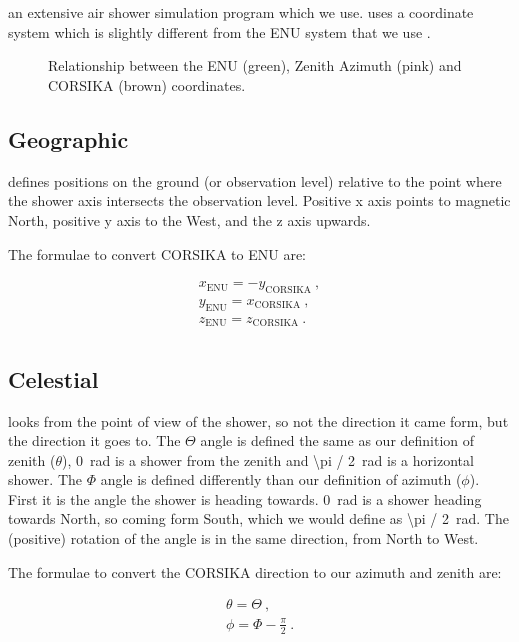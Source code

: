 \section{\corsika}

\corsika an extensive air shower simulation program which we use.
\corsika uses a coordinate system which is slightly different from the
ENU system that we use \cite{heck:2013aa}.

\begin{figure}
    \centering
    
    \caption{Relationship between the ENU (green), Zenith Azimuth (pink)
             and CORSIKA (brown) coordinates.}
    \label{fig:enu_corsika}
\end{figure}


\subsection{Geographic}

\corsika defines positions on the ground (or observation level) relative
to the point where the shower axis intersects the observation level.
Positive x axis points to magnetic North, positive y axis to the West,
and the z axis upwards.

The formulae to convert CORSIKA to ENU are:

\begin{equation}
    \begin{array}{l}
        x_{\mathrm{ENU}} = -y_{\mathrm{CORSIKA}} \ , \\
        y_{\mathrm{ENU}} = x_{\mathrm{CORSIKA}} \ , \\
        z_{\mathrm{ENU}} = z_{\mathrm{CORSIKA}} \ . \\
    \end{array}
\end{equation}


\subsection{Celestial}

\corsika looks from the point of view of the shower, so not the
direction it came form, but the direction it goes to. The $\Theta$ angle
is defined the same as our definition of zenith ($\theta$),
\SI{0}{\radian} is a shower from the zenith and \SI{\pi / 2}{\radian} is
a horizontal shower. The $\Phi$ angle is defined differently than our
definition of azimuth ($\phi$). First it is the angle the shower is heading
towards. \SI{0}{\radian} is a shower heading towards North, so coming
form South, which we would define as \SI{\pi / 2}{\radian}. The
(positive) rotation of the angle is in the same direction, from North to
West.

The formulae to convert the CORSIKA direction to our azimuth and zenith are:

\begin{equation}
    \begin{array}{l}
        \theta = \Theta \ , \\
        \phi = \Phi - \frac{\pi}{2} \ . \\
    \end{array}
\end{equation}


\printbibliography
